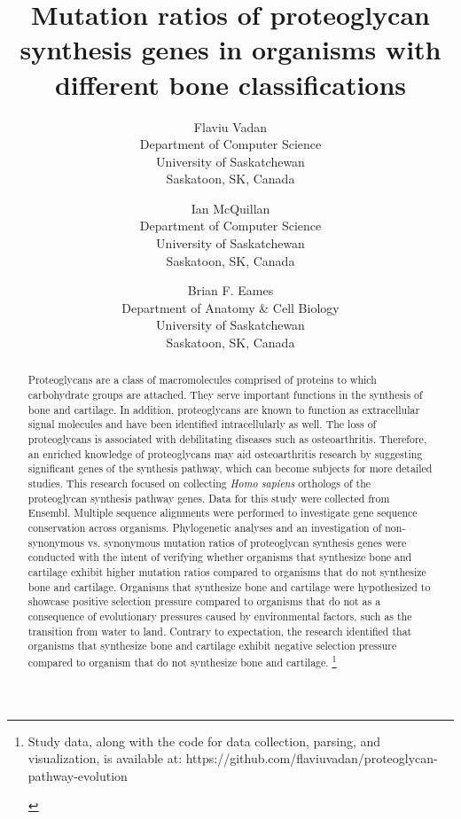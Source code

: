 \documentclass{article}
\title{Mutation ratios of proteoglycan synthesis genes in organisms with different bone classifications}
\author{
    	Flaviu Vadan \\
    	\small{Department of Computer Science} \\
	\small{University of Saskatchewan} \\
    	\small{Saskatoon, SK, Canada}
    	\and
    	Ian McQuillan \\
    	\small{Department of Computer Science} \\
	\small{University of Saskatchewan} \\
	\small{Saskatoon, SK, Canada}
	\and
	Brian F. Eames \\
	\small{Department of Anatomy \& Cell Biology} \\
	\small{University of Saskatchewan} \\
	\small{Saskatoon, SK, Canada}
}
\begin{document}
\maketitle

\begin{abstract}
Proteoglycans are a class of macromolecules comprised of proteins to which carbohydrate groups are attached. They serve important functions in the synthesis of bone and cartilage. In addition, proteoglycans are known to function as extracellular signal molecules and have been identified intracellularly as well. The loss of proteoglycans is associated with debilitating diseases such as osteoarthritis. Therefore, an enriched knowledge of proteoglycans may aid osteoarthritis research by suggesting significant genes of the synthesis pathway, which can become subjects for more detailed studies. This research focused on collecting \textit{Homo sapiens} orthologs of the proteoglycan synthesis pathway genes. Data for this study were collected from Ensembl. Multiple sequence alignments were performed to investigate gene sequence conservation across organisms. Phylogenetic analyses and an investigation of non-synonymous vs. synonymous mutation ratios of proteoglycan synthesis genes were conducted with the intent of verifying whether organisms that synthesize bone and cartilage exhibit higher mutation ratios compared to organisms that do not synthesize bone and cartilage. Organisms that synthesize bone and cartilage were hypothesized to showcase positive selection pressure compared to organisms that do not as a consequence of evolutionary pressures caused by environmental factors, such as the transition from water to land. Contrary to expectation, the research identified that organisms that synthesize bone and cartilage exhibit negative selection pressure compared to organism that do not synthesize bone and cartilage. 
\footnote{
	\begin{flushleft}
		Study data, along with the code for data collection, parsing, and visualization, is available at: https://github.com/flaviuvadan/proteoglycan-pathway-evolution
	\end{flushleft}
}
\end{abstract}

\newpage
\end{document}
